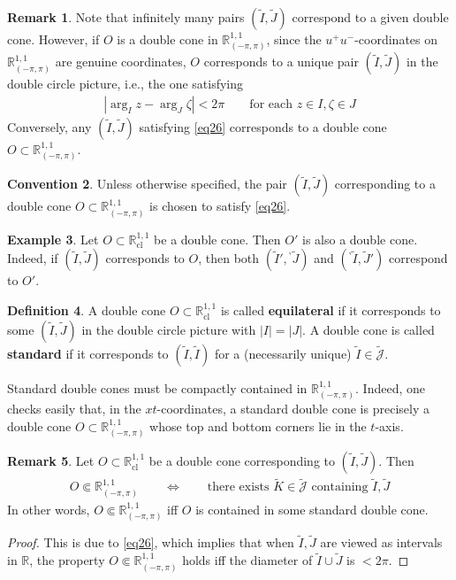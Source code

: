 \documentclass[11pt,b5paper,notitlepage]{article}
\theoremstyle{definition}
\newtheorem{df}{Definition}[section]
\newtheorem{eg}[df]{Example}
\newtheorem{rem}[df]{Remark}
\newtheorem{cv}[df]{Convention}
\theoremstyle{plain}
\newcommand{\wtd}{\widetilde}
\newcommand{\Jtd}{\widetilde{\mathcal J}}
\newcommand{\Rbb}{\mathbb R}
\newcommand{\bpr}{{}^\backprime}
\newcommand{\Rcl}{\mathbb R^{1,1}_{\mathrm{cl}}}
\newcommand{\Rpp}{\mathbb R^{1,1}_{(-\pi,\pi)}}
\numberwithin{equation}{section}
\begin{document}
\begin{rem}\label{lb55}
Note that infinitely many pairs $(\wtd I,\wtd J)$ correspond to a given double cone. However, if $O$ is a double cone in $\Rpp$, since the $u^+u^-$-coordinates on $\Rpp$ are genuine coordinates, $O$ corresponds to a unique pair $(\wtd I,\wtd J)$ in the double circle picture, i.e., the one satisfying
\begin{align}\label{eq26}
|\arg_I z-\arg_J\zeta|<2\pi\qquad\text{for each }z\in I,\zeta\in J
\end{align}
Conversely, any $(\wtd I,\wtd J)$ satisfying \eqref{eq26} corresponds to a double cone $O\subset\Rpp$. 
\end{rem}

\begin{cv}\label{lb122}
Unless otherwise specified, the pair $(\wtd I,\wtd J)$ corresponding to a double cone $O\subset\Rpp$ is chosen to satisfy \eqref{eq26}. 
\end{cv}


\begin{eg}
Let $O\subset\Rcl$ be a double cone. Then $O'$ is also a double cone. Indeed, if $(\wtd I,\wtd J)$ corresponds to $O$, then both $(\wtd I',\bpr\wtd J)$ and $(\bpr\wtd I,\wtd J')$ correspond to $O'$.
\end{eg}


\begin{df}
A double cone $O\subset\Rcl$ is called \textbf{equilateral} if it corresponds to some $(\wtd I,\wtd J)$ in the double circle picture with $|I|=|J|$. A double cone is called \textbf{standard} if it corresponds to $(\wtd I,\wtd I)$ for a (necessarily unique) $\wtd I\in\Jtd$. 
\end{df}

Standard double cones must be compactly contained in $\Rpp$. Indeed, one checks easily that, in the $xt$-coordinates, a standard double cone is precisely a double cone $O\subset\Rpp$ whose top and bottom corners lie in the $t$-axis.

\begin{rem}\label{lb56}
Let $O\subset\Rcl$ be a double cone corresponding to $(\wtd I,\wtd J)$. Then 
\begin{align*}
O\Subset\Rpp\qquad\Longleftrightarrow\qquad\text{there exists $\wtd K\in\Jtd$ containing $\wtd I,\wtd J$}
\end{align*}
In other words, $O\Subset\Rpp$ iff $O$ is contained in some standard double cone.
\end{rem}

\begin{proof}
This is due to \eqref{eq26}, which implies that when $\wtd I,\wtd J$ are viewed as intervals in $\Rbb$, the property $O\Subset\Rpp$ holds iff the diameter of $\wtd I\cup\wtd J$ is $<2\pi$.
\end{proof}
\end{document}
